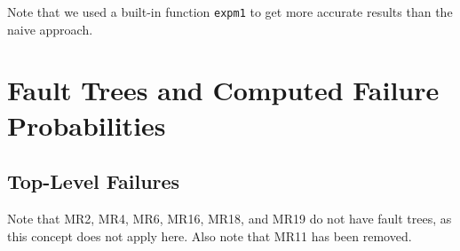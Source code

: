 \documentclass[a4paper,parskip,headheight=38pt]{scrartcl} %
\begin{document}
Note that we used a built-in function \texttt{expm1} to get more accurate
results than the naive approach.


\section{Fault Trees and Computed Failure Probabilities}

\subsection*{Top-Level Failures}

Note that MR2, MR4, MR6, MR16, MR18, and MR19 do
not have fault trees, as this concept does not apply here.  Also note
that MR11 has been removed.

\newcommand{\refpdf}[1]{(\texttt{\href{trees/#1.pdf}{\texttt{#1.pdf}}})}
\end{document}
